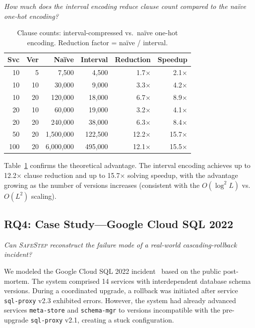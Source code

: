 \documentclass[10pt,twocolumn]{article}
\newcommand{\safestep}{\textsc{SafeStep}}
\begin{document}
\emph{How much does the interval encoding reduce clause count
compared to the na\"ive one-hot encoding?}

\begin{table}[t]
\centering
\caption{Clause counts: interval-compressed vs.\ na\"ive
  one-hot encoding. Reduction factor = na\"ive / interval.}
\label{tab:encoding}
\small
\begin{tabular}{@{}rrrrrr@{}}
\toprule
Svc & Ver & Na\"ive & Interval & Reduction & Speedup \\
\midrule
10  & 5   & 7,500   & 4,500   & 1.7$\times$   & 2.1$\times$ \\
10  & 10  & 30,000   & 9,000   & 3.3$\times$  & 4.2$\times$ \\
10  & 20  & 120,000  & 18,000   & 6.7$\times$  & 8.9$\times$ \\
20  & 10  & 60,000  & 19,000  & 3.2$\times$  & 4.1$\times$ \\
20  & 20  & 240,000  & 38,000  & 6.3$\times$  & 8.4$\times$ \\
50  & 20  & 1,500,000    & 122,500 & 12.2$\times$  & 15.7$\times$ \\
100 & 20  & 6,000,000   & 495,000 & 12.1$\times$  & 15.5$\times$ \\
\bottomrule
\end{tabular}
\end{table}

Table~\ref{tab:encoding} confirms the theoretical advantage.
The interval encoding achieves up to 12.2$\times$ clause reduction
and up to 15.7$\times$ solving speedup, with the advantage growing
as the number of versions increases (consistent with the
$O(\log^2 L)$ vs.\ $O(L^2)$ scaling).

\subsection{RQ4: Case Study---Google Cloud SQL 2022}

\emph{Can \safestep{} reconstruct the failure mode of a
real-world cascading-rollback incident?}

We modeled the Google Cloud SQL 2022 incident~\cite{gcloud-sql-2022}
based on the public post-mortem. The system comprised 14
services with interdependent database schema versions. During
a coordinated upgrade, a rollback was initiated after service
\texttt{sql-proxy} v2.3 exhibited errors. However, the system
had already advanced services \texttt{meta-store} and
\texttt{schema-mgr} to versions incompatible with the
pre-upgrade \texttt{sql-proxy} v2.1, creating a stuck
configuration.
\end{document}
